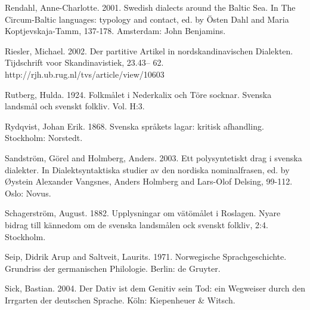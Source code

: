 \begin{styleBodytextC}
Rendahl, Anne-Charlotte. 2001. Swedish dialects around the Baltic Sea. In The Circum-Baltic languages: typology and contact, ed. by Östen Dahl and Maria Koptjevskaja-Tamm, 137-178. Amsterdam: John Benjamins.

\end{styleBodytextC}

\begin{styleBodytextC}
Riesler, Michael. 2002. Der partitive Artikel in nordskandinavischen Dialekten. Tijdschrift voor Skandinavistiek, 23.43– 62. http://rjh.ub.rug.nl/tvs/article/view/10603

\end{styleBodytextC}

\begin{styleBodytextC}
Rutberg, Hulda. 1924. Folkmålet i Nederkalix och Töre socknar. Svenska landsmål och svenskt folkliv. Vol. H:3.

\end{styleBodytextC}

\begin{styleBodytextC}
Rydqvist, Johan Erik. 1868. Svenska språkets lagar: kritisk afhandling. Stockholm: Norstedt.

\end{styleBodytextC}

\begin{styleBodytextC}
Sandström, Görel and Holmberg, Anders. 2003. Ett polysyntetiskt drag i svenska dialekter. In Dialektsyntaktiska studier av den nordiska nominalfrasen, ed. by Øystein Alexander Vangsnes, Anders Holmberg and Lars-Olof Delsing, 99-112. Oslo: Novus.

\end{styleBodytextC}

\begin{styleBodytextC}
Schagerström, August. 1882. Upplysningar om vätömålet i Roslagen. Nyare bidrag till kännedom om de svenska landsmålen ock svenskt folkliv, 2:4. Stockholm.

\end{styleBodytextC}

\begin{styleBodytextC}
Seip, Didrik Arup and Saltveit, Laurits. 1971. Norwegische Sprachgeschichte. Grundriss der germanischen Philologie. Berlin: de Gruyter.

\end{styleBodytextC}

\begin{styleBodytextC}
Sick, Bastian. 2004. Der Dativ ist dem Genitiv sein Tod: ein Wegweiser durch den Irrgarten der deutschen Sprache. Köln: Kiepenheuer \& Witsch.

\end{styleBodytextC}

